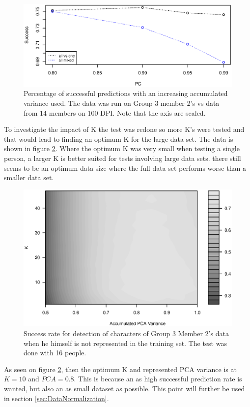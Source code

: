 \begin{figure}[H]
\centering
\includegraphics[width =0.95 \textwidth]{graphics/pca_success}
\caption[PCA performance]{Percentage of successful predictions with an increasing accumulated variance used.
The data was run on Group 3 member 2's vs data from 14 members on 100 DPI. Note that the axis are scaled.}
\label{fig:pca_success}
\end{figure}

To investigate the impact of K the test was redone so more K's were tested and that would lead to finding an optimum K for the large data set.
The data is shown in figure \ref{fig:k_v_PCA}. 
Where the optimum K was very small when testing a single person, a larger K is better suited for tests involving large data sets.
there still seems to be an optimum data size where the full data set performs worse than a smaller data set. 

\begin{figure}[H]
\centering
\includegraphics[width = \textwidth]{graphics/contour_k_PCA_oneVsRest}
\caption[Detailed PCA performance]{Success rate for detection of characters of Group 3 Member 2's data when he himself is not represented in the training set. 
The test was done with 16 people.}
\label{fig:k_v_PCA}
\end{figure}

As seen on figure \ref{fig:k_v_PCA}, then the optimum K and represented PCA variance is at $K = 10$ and $PCA = 0.8$. 
This is because an as high successful prediction rate is wanted, but also an as small dataset as possible. 
This point will further be used in section \ref{sec:DataNormalization}.

